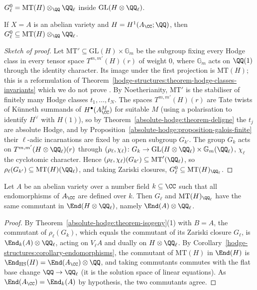 \begin{conjecture}\label{absolute-hodge:conjecture-mumford-tate}
$G_\ell^0 = \mathrm{MT}(H) \otimes_\QQ\QQ_\ell$ inside $\mathrm{GL}(H \otimes \QQ_\ell)$.
\end{conjecture}

\begin{theorem}[Deligne]\label{absolute-hodge:theorem-deligne-inclusion}
If $X = A$ is an abelian variety and $H = H^1(A_\CC; \QQ)$, then $G_\ell^0 \subseteq \mathrm{MT}(H) \otimes_\QQ\QQ_\ell$.
\end{theorem}

\begin{proof}[Sketch of proof]
Let $\mathrm{MT}' \subseteq \mathrm{GL}(H) \times \mathbb{G}_m$ be the subgroup fixing every Hodge class in every tensor space $T^{m,m'}(H)(r)$ of weight $0$, where $\mathbb{G}_m$ acts on $\QQ(1)$ through the identity
character. Its image under the first projection is $\mathrm{MT}(H)$; this is a reformulation of Theorem~\ref{hodge-structures:theorem-hodge-classes-invariants} which we do not prove \cite{deligne-abelian}. By
Noetherianity, $\mathrm{MT}'$ is the stabiliser of finitely many Hodge classes $t_1, \ldots, t_N$. The spaces $T^{m,m'}(H)(r)$ are Tate twists of Künneth summands of $H^\bullet(A^M_\CC)$ for suitable $M$ (using a
polarisation to identify $H^\vee$ with $H(1)$), so by Theorem~\ref{absolute-hodge:theorem-deligne} the $t_j$ are absolute Hodge, and by Proposition~\ref{absolute-hodge:proposition-galois-finite} their $\ell$-adic
incarnations are fixed by an open subgroup $G_{k'}$. The group $G_k$ acts on $T^{m,m'}(H \otimes \QQ_\ell)(r)$ through $(\rho_\ell, \chi_\ell) \colon G_k \to \mathrm{GL}(H \otimes \QQ_\ell) \times \mathbb{G}_m(\QQ_\ell)$,
$\chi_\ell$ the cyclotomic character. Hence $(\rho_\ell, \chi_\ell)(G_{k'}) \subseteq \mathrm{MT}'(\QQ_\ell)$, so $\rho_\ell(G_{k'}) \subseteq \mathrm{MT}(H)(\QQ_\ell)$, and taking Zariski closures,
$G_\ell^0 \subseteq \mathrm{MT}(H)_{\QQ_\ell}$.
\end{proof}

\begin{proposition}\label{absolute-hodge:proposition-commutants}
Let $A$ be an abelian variety over a number field $k \subseteq \CC$ such that all endomorphisms of $A_\CC$ are defined over $k$. Then $G_\ell$ and $\mathrm{MT}(H)_{\QQ_\ell}$ have the same commutant in
$\End(H \otimes \QQ_\ell)$, namely $\End(A) \otimes \QQ_\ell$.
\end{proposition}

\begin{proof}
By Theorem~\ref{absolute-hodge:theorem-isogeny}(1) with $B = A$, the commutant of $\rho_\ell(G_k)$, which equals the commutant of its Zariski closure $G_\ell$, is $\End_k(A) \otimes \QQ_\ell$, acting on
$V_\ell A$ and dually on $H \otimes \QQ_\ell$. By Corollary~\ref{hodge-structures:corollary-endomorphisms}, the commutant of $\mathrm{MT}(H)$ in $\End(H)$ is $\End_{\mathrm{HS}}(H) = \End(A_\CC) \otimes \QQ$, and taking
commutants commutes with the flat base change $\QQ \to \QQ_\ell$ (it is the solution space of linear equations). As $\End(A_\CC) = \End_k(A)$ by hypothesis, the two commutants agree.
\end{proof}

